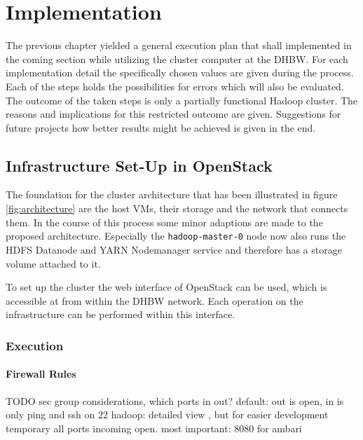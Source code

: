 \chapter{Implementation}
\label{chap:impl}

The previous chapter yielded a general execution plan that shall implemented in the coming 
section while utilizing the cluster computer at the \ac{DHBW}. 
For each implementation detail the specifically chosen values are given during the process. Each of the steps holds 
the possibilities for errors which will also be evaluated.
The outcome of the taken steps is only a partially functional Hadoop cluster.
The reasons and implications for this restricted outcome are given.
Suggestions for future projects how better results might be achieved is given in the end.

\section{Infrastructure Set-Up in OpenStack}

The foundation for the cluster architecture that has been illustrated in figure \vref{fig:architecture} are the host \acp{VM}, their storage and the network that connects them.
In the course of this process some minor adaptions are made to the proposed architecture.
Especially the \texttt{hadoop-master-0} node now also runs the \ac{HDFS} Datanode and YARN Nodemanager service and therefore has a storage volume attached to it.


To set up the cluster the web interface of OpenStack can be used, which is accessible at
 from within the \ac{DHBW} network.
Each operation on the infrastructure can be performed within this interface.

\subsection{Execution}

\subsubsection{Firewall Rules}

TODO sec group considerations, which ports in out? 
default: out is open, in is only ping and ssh on 22
hadoop: detailed view \autocite[][]{hortonworks2017reference}, but for easier development temporary all ports incoming open. most important: 8080 for ambari


